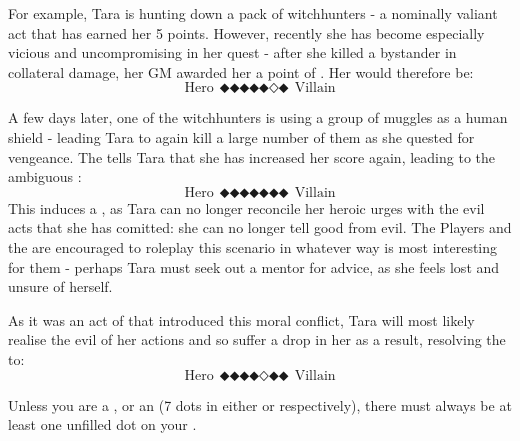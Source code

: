 For example, Tara is hunting down a pack of witchhunters - a nominally valiant act that has earned her 5  points. However, recently she has become especially vicious and uncompromising in her quest - after she killed a bystander in collateral damage, her GM awarded her a point of . Her  would therefore be:
$$ \text{Hero}~~\mdblkdiamond\mdblkdiamond\mdblkdiamond\mdblkdiamond\mdblkdiamond\mdwhtdiamond\mdblkdiamond~~\text{Villain}$$

A few days later, one of the witchhunters is using a group of muggles as a human shield - leading Tara to again kill a large number of them as she quested for vengeance. The  tells Tara that she has increased her  score again, leading to the ambiguous :
$$ \text{Hero}~~\mdblkdiamond\mdblkdiamond\mdblkdiamond\mdblkdiamond\mdblkdiamond\mdblkdiamond\mdblkdiamond~~\text{Villain}$$
This induces a , as Tara can no longer reconcile her heroic urges with the evil acts that she has comitted: she can no longer tell good from evil. The Players and the  are encouraged to roleplay this scenario in whatever way is most interesting for them - perhaps Tara must seek out a mentor for advice, as she feels lost and unsure of herself. 

As it was an act of  that introduced this moral conflict, Tara will most likely realise the evil of her actions and so suffer a drop in her  as a result, resolving the  to:
$$ \text{Hero}~~\mdblkdiamond\mdblkdiamond\mdblkdiamond\mdblkdiamond\mdwhtdiamond\mdblkdiamond\mdblkdiamond~~\text{Villain}$$

Unless you are a , or an  (7 dots in either  or  respectively), there must always be at least one unfilled dot on your . 
